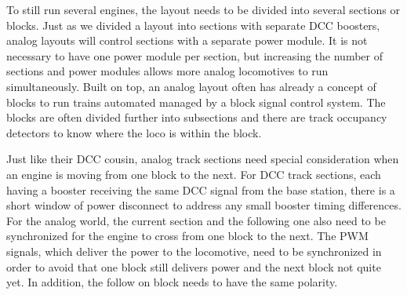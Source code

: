 \begin{center}
\end{center}

To still run several engines, the layout needs to be divided into several sections or blocks. Just as we divided a layout into sections with separate DCC boosters, analog layouts will control sections with a separate power module. It is not necessary to have one power module per section, but increasing the number of sections and power modules allows more analog locomotives to run simultaneously. Built on top, an analog layout often has already a concept of blocks to run trains automated managed by a block signal control system. The blocks are often divided further into subsections and there are track occupancy detectors to know where the loco is within the block.

Just like their DCC cousin, analog track sections need special consideration when an engine is moving from one block to the next. For DCC track sections, each having a booster receiving the same DCC signal from the base station, there is a short window of power disconnect to address any small booster timing differences. For the analog world, the current section and the following one also need to be synchronized for the engine to cross from one block to the next. The PWM signals, which deliver the power to the locomotive, need to be synchronized in order to avoid that one block still delivers power and the next block not quite yet. In addition, the follow on block needs to have the same polarity.

